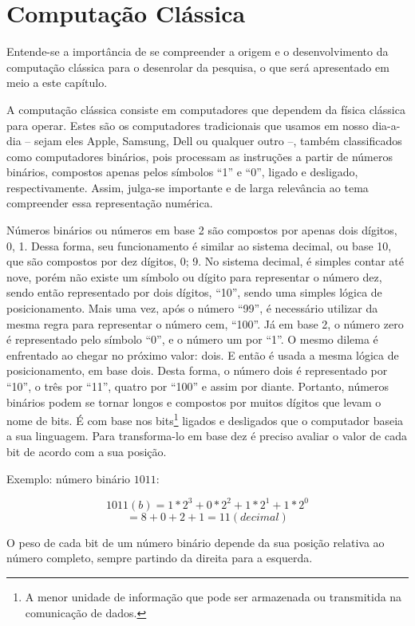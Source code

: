 \section{Computação Clássica} 
\label{classic_comp}
Entende-se a importância de se compreender a origem e o desenvolvimento da computação clássica para o desenrolar da pesquisa, o que será apresentado em meio a este capítulo.

A computação clássica consiste em computadores que dependem da física clássica para operar. Estes são os computadores tradicionais que usamos em nosso dia-a-dia – sejam eles Apple, Samsung, Dell ou qualquer outro –, também classificados como computadores binários, pois processam as instruções a partir de números binários, compostos apenas pelos símbolos ``1'' e ``0'', ligado e desligado, respectivamente. Assim, julga-se importante e de larga relevância ao tema compreender essa representação numérica. 

Números binários ou números em base 2 são compostos por apenas dois dígitos, {0, 1}. Dessa forma, seu funcionamento é similar ao sistema decimal, ou base 10, que são compostos por dez dígitos, {0; 9}. No sistema decimal, é simples contar até nove, porém não existe um símbolo ou dígito para representar o número dez, sendo então representado por dois dígitos, ``10'', sendo uma simples lógica de posicionamento. Mais uma vez, após o número ``99'', é necessário utilizar da mesma regra para representar o número cem, ``100''. Já em base 2, o número zero é representado pelo símbolo ``0'', e o número um por ``1''. O mesmo dilema é enfrentado ao chegar no próximo valor: dois. E então é usada a mesma lógica de posicionamento, em base dois. Desta forma, o número dois é representado por ``10'', o três por ``11'', quatro por ``100'' e assim por diante. Portanto, números binários podem se tornar longos e compostos por muitos dígitos que levam o nome de bits. \cite{6} É com base nos \label{bits}bits\footnote{A menor unidade de informação que pode ser armazenada ou transmitida na comunicação de dados.} ligados e desligados que o computador baseia a sua linguagem. Para transforma-lo em base dez é preciso avaliar o valor de cada bit de acordo com a sua posição. 

Exemplo: número binário $1011$:

\[ 1011(b) = 1*2^3 + 0*2^2 + 1*2^1 + 1*2^0\]
\[ = 8 + 0 + 2 + 1 = 11(decimal)\]

O peso de cada bit de um número binário depende da sua posição relativa ao número completo, sempre partindo da direita para a esquerda.

